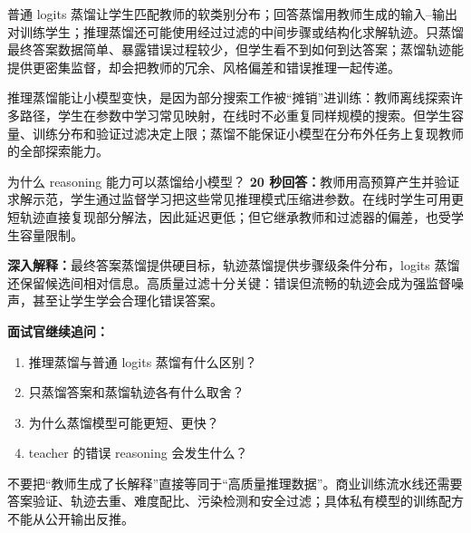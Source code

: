\figReasoningDistill

普通 logits 蒸馏让学生匹配教师的软类别分布；回答蒸馏用教师生成的输入--输出对训练学生；推理蒸馏还可能使用经过过滤的中间步骤或结构化求解轨迹。只蒸馏最终答案数据简单、暴露错误过程较少，但学生看不到如何到达答案；蒸馏轨迹能提供更密集监督，却会把教师的冗余、风格偏差和错误推理一起传递。

推理蒸馏能让小模型变快，是因为部分搜索工作被“摊销”进训练：教师离线探索许多路径，学生在参数中学习常见映射，在线时不必重复同样规模的搜索。但学生容量、训练分布和验证过滤决定上限；蒸馏不能保证小模型在分布外任务上复现教师的全部探索能力。

\begin{interviewbox}{为什么 reasoning 能力可以蒸馏给小模型？}
\textbf{20 秒回答：}教师用高预算产生并验证求解示范，学生通过监督学习把这些常见推理模式压缩进参数。在线时学生可用更短轨迹直接复现部分解法，因此延迟更低；但它继承教师和过滤器的偏差，也受学生容量限制。

\textbf{深入解释：}最终答案蒸馏提供硬目标，轨迹蒸馏提供步骤级条件分布，logits 蒸馏还保留候选间相对信息。高质量过滤十分关键：错误但流畅的轨迹会成为强监督噪声，甚至让学生学会合理化错误答案。

\textbf{面试官继续追问：}
\begin{enumerate}
  \item 推理蒸馏与普通 logits 蒸馏有什么区别？
  \item 只蒸馏答案和蒸馏轨迹各有什么取舍？
  \item 为什么蒸馏模型可能更短、更快？
  \item teacher 的错误 reasoning 会发生什么？
\end{enumerate}
\end{interviewbox}

\begin{pitfallbox}
不要把“教师生成了长解释”直接等同于“高质量推理数据”。商业训练流水线还需要答案验证、轨迹去重、难度配比、污染检测和安全过滤；具体私有模型的训练配方不能从公开输出反推。
\end{pitfallbox}
